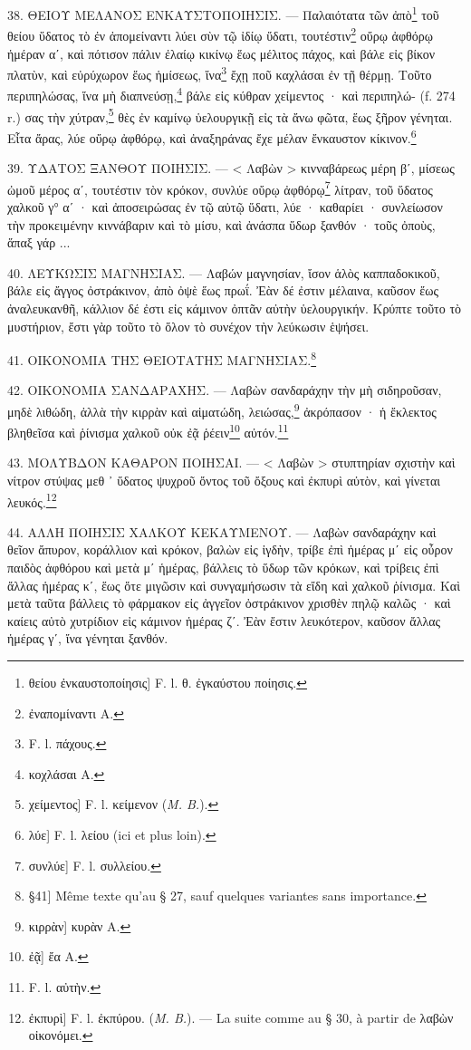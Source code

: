\documentclass[a4paper, 11pt, oneside, polutonikogreek, french]{article}
\begin{document}
38. ΘΕΙΟΥ ΜΕΛΑΝΟΣ ΕΝΚΑΥΣΤΟΠΟΙΗΣΙΣ. --- Παλαιότατα τῶν ἀπὸ\footnote{θείου ἐνκαυστοποίησις] F. l. θ. ἐγκαύστου ποίησις.} τοῦ θείου ὕδατος τὸ ἐν ἀπομείναντι λύει σὺν τῷ ἰδίῳ ὕδατι, τουτέστιν\footnote{ἐναπομίναντι A.} οὔρῳ ἀφθόρῳ ἡμέραν αʹ, καὶ πότισον πάλιν ἐλαίῳ κικίνῳ ἕως μέλιτος πάχος, καὶ βάλε εἰς βίκον πλατὺν, καὶ εὐρύχωρον ἕως ἡμίσεως, ἵνα\footnote{F. l. πάχους.} ἔχῃ ποῦ καχλάσαι ἐν τῇ θέρμῃ. Τοῦτο περιπηλώσας, ἵνα μὴ διαπνεύσῃ,\footnote{κοχλάσαι A.} βάλε εἰς κύθραν χείμεντος · καὶ περιπηλώ- (f. 274 r.) σας τὴν χύτραν,\footnote{χείμεντος] F. l. κείμενον (\emph{M. B.}).} θὲς ἐν καμίνῳ ὑελουργικῇ εἰς τὰ ἄνω φῶτα, ἕως ξῆρον γένηται. Εἶτα ἄρας, λύε οὔρῳ ἀφθόρῳ, καὶ ἀναξηράνας ἔχε μέλαν ἔνκαυστον κίκινον.\footnote{λύε] F. l. λείου (ici et plus loin).}

39. ΥΔΑΤΟΣ ΞΑΝΘΟΥ ΠΟΙΗΣΙΣ. --- < Λαβὼν > κινναβάρεως μέρη βʹ, μίσεως ὠμοῦ μέρος αʹ, τουτέστιν τὸν κρόκον, συνλύε οὔρῳ ἀφθόρῳ\footnote{συνλύε] F. l. συλλείου.} λίτραν, τοῦ ὕδατος χαλκοῦ γ° αʹ · καὶ ἀποσειρώσας ἐν τῷ αὐτῷ ὕδατι, λύε · καθαρίει · συνλείωσον τὴν προκειμένην κιννάβαριν καὶ τὸ μίσυ, καὶ ἀνάσπα ὕδωρ ξανθόν · τοῦς ὀποὺς, ἅπαξ γάρ ...

40. ΛΕΥΚΩΣΙΣ ΜΑΓΝΗΣΙΑΣ. --- Λαβών μαγνησίαν, ἴσον ἁλὸς καππαδοκικοῦ, βάλε εἰς ἄγγος ὀστράκινον, ἀπὸ ὀψὲ ἕως πρωΐ. Ἐὰν δέ ἐστιν μέλαινα, καῦσον ἕως ἀναλευκανθῆ, κάλλιον δέ ἐστι εἰς κάμινον ὀπτᾶν αὐτὴν ὑελουργικήν. Κρύπτε τοῦτο τὸ μυστήριον, ἔστι γὰρ τοῦτο τὸ ὅλον τὸ συνέχον τὴν λεύκωσιν ἑψήσει.

41. ΟΙΚΟΝΟΜΙΑ ΤΗΣ ΘΕΙΟΤΑΤΗΣ ΜΑΓΝΗΣΙΑΣ.\footnote{§41] Même texte qu'au § 27, sauf quelques variantes sans importance.}

42. ΟΙΚΟΝΟΜΙΑ ΣΑΝΔΑΡΑΧΗΣ. --- Λαβὼν σανδαράχην τὴν μὴ σιδηροῦσαν, μηδὲ λιθώδη, ἀλλὰ τὴν κιρρὰν καὶ αἱματώδη, λειώσας,\footnote{κιρρὰν] κυρὰν A.} ἀκρόπασον · ἡ ἔκλεκτος βληθεῖσα καὶ ῥίνισμα χαλκοῦ οὐκ ἐᾷ ῥέειν\footnote{ἐᾷ] ἔα A.} αὐτόν.\footnote{F. l. αὐτὴν.}

43. ΜΟΛΥΒΔΟΝ ΚΑΘΑΡΟΝ ΠΟΙΗΣΑΙ. --- < Λαβὼν > στυπτηρίαν σχιστὴν καὶ νίτρον στύψας μεθ ᾽ ὕδατος ψυχροῦ ὄντος τοῦ ὄξους καὶ ἐκπυρὶ αὐτὸν, καὶ γίνεται λευκός.\footnote{ἐκπυρὶ] F. l. ἐκπύρου. (\emph{M. B.}). --- La suite comme au § 30, à partir de λαβὼν οἰκονόμει.}

44. ΑΛΛΗ ΠΟΙΗΣΙΣ ΧΑΛΚΟΥ ΚΕΚΑΥΜΕΝΟΥ. --- Λαβὼν σανδαράχην καὶ θεῖον ἄπυρον, κοράλλιον καὶ κρόκον, βαλὼν εἰς ἰγδὴν, τρίβε ἐπὶ ἡμέρας μʹ εἰς οὖρον παιδὸς ἀφθόρου καὶ μετὰ μʹ ἡμέρας, βάλλεις τὸ ὕδωρ τῶν κρόκων, καὶ τρίβεις ἐπὶ ἄλλας ἡμέρας κʹ, ἕως ὅτε μιγῶσιν καὶ συνγαμήσωσιν τὰ εἴδη καὶ χαλκοῦ ῥίνισμα. Καὶ μετὰ ταῦτα βάλλεις τὸ φάρμακον εἰς ἀγγεῖον ὀστράκινον χρισθὲν πηλῷ καλῶς · καὶ καίεις αὐτὸ χυτρίδιον εἰς κάμινον ἡμέρας ζʹ. Ἐὰν ἔστιν λευκότερον, καῦσον ἄλλας ἡμέρας γʹ, ἴνα γένηται ξανθόν.
\end{document}
